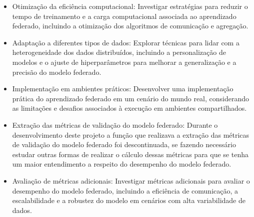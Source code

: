 \begin{itemize}
    \item Otimização da eficiência computacional: Investigar estratégias para reduzir o tempo de treinamento e a carga computacional associada ao aprendizado federado, incluindo a otimização dos algoritmos de comunicação e agregação.
    \item Adaptação a diferentes tipos de dados: Explorar técnicas para lidar com a heterogeneidade dos dados distribuídos, incluindo a personalização de modelos e o ajuste de hiperparâmetros para melhorar a generalização e a precisão do modelo federado.
    \item Implementação em ambientes práticos: Desenvolver uma implementação prática do aprendizado federado em um cenário do mundo real, considerando as limitações e desafios associados à execução em ambientes compartilhados.
    \item Extração das métricas de validação do modelo federado: Durante o desenvolvimento deste projeto a função que realizava a extração das métricas de validação do modelo federado foi descontinuada, se fazendo necessário estudar outras formas de realizar o cálculo dessas métricas para que se tenha um maior entendimento a respeito do desempenho do modelo federado.
    \item Avaliação de métricas adicionais: Investigar métricas adicionais para avaliar o desempenho do modelo federado, incluindo a eficiência de comunicação, a escalabilidade e a robustez do modelo em cenários com alta variabilidade de dados.
\end{itemize}
